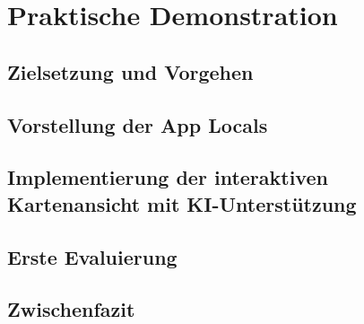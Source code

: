 \chapter{Praktische Demonstration}

\section{Zielsetzung und Vorgehen}


\section{Vorstellung der App \glqq Locals\grqq}


\section{Implementierung der interaktiven Kartenansicht mit KI-Unterstützung}


\section{Erste Evaluierung}


\section{Zwischenfazit}
 